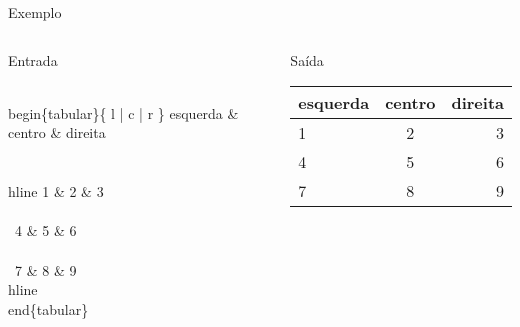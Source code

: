 \begin{frame}[fragile]{Exemplo}
    
    \begin{columns}
    \column{7cm}
    \begin{block}{Entrada}
        \begin{semiverbatim}
\footnotesize\\begin\{tabular\}\{ l | c | r \}
esquerda \& centro \& direita \\\\
\\hline
1 \& 2 \& 3 \\\\
\\cline{2-2}
4 \& 5 \& 6 \\\\
\\cline{2-2}
7 \& 8 \& 9 
\\hline
\\end\{tabular\}
\end{semiverbatim}
    \end{block}

    \begin{block}{Saída}
    \footnotesize{
        \begin{tabular}{l|c|r}
        esquerda & centro & direita \\
        \hline
        1 & 2 & 3 \\
        \cline{2-2}
        4 & 5 & 6 \\
        \cline{2-2}
        7 & 8 & 9 \\
        \hline
        \end{tabular}
    }
    \end{block}
    \end{columns}
\end{frame}

